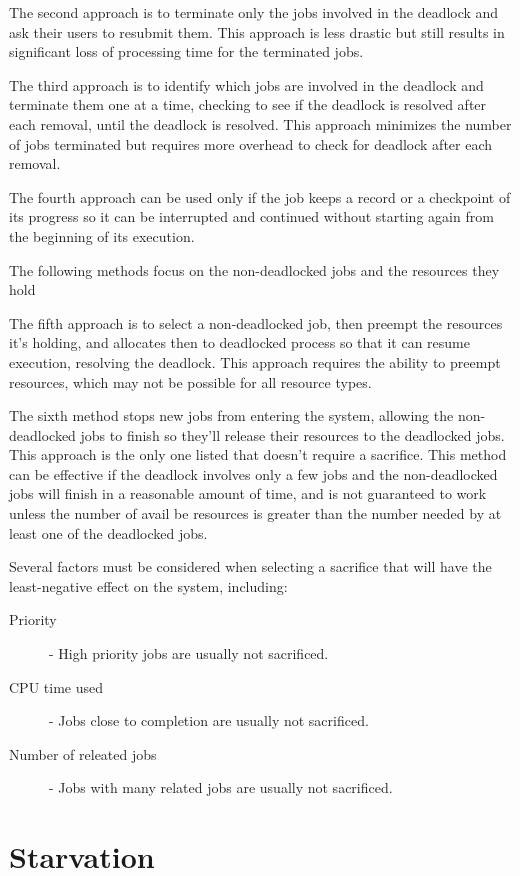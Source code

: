 \documentclass[12pt letter]{report}
\begin{document}
The second approach is to terminate only the jobs involved in the
deadlock and ask their users to resubmit them. This approach is less drastic but
still results in significant loss of processing time for the
terminated jobs.

The third approach is to identify which jobs are involved in the
deadlock and terminate them one at a time, checking to see if the
deadlock is resolved after each removal, until the deadlock is
resolved. This approach minimizes the number of jobs terminated but
requires more overhead to check for deadlock after each removal.

The fourth approach can be used only if the job keeps a record or a
checkpoint of its progress so it can be interrupted and continued
without starting again from the beginning of its execution.

The following methods focus on the non-deadlocked jobs and the
resources they hold

The fifth approach is to select a non-deadlocked job, then preempt
the resources it's holding, and allocates then to deadlocked process
so that it can resume execution, resolving the deadlock. This
approach requires the ability to preempt resources, which may not be
possible for all resource types.

The sixth method stops new jobs from entering the system, allowing
the non-deadlocked jobs to finish so they'll release their resources
to the deadlocked jobs. This approach is the only one listed that
doesn't require a sacrifice. This method can be effective if the
deadlock involves only a few jobs and the non-deadlocked jobs will
finish in a reasonable amount of time, and is not guaranteed to work
unless the number of avail be resources is greater than the number
needed by at least one of the deadlocked jobs.

Several factors must be considered when selecting a sacrifice that
will have the least-negative effect on the system, including:
\begin{description}
  \item[Priority]  - High priority jobs are usually not sacrificed.
  \item[CPU time used] - Jobs close to completion are usually not sacrificed.
  \item[Number of releated jobs] - Jobs with many related jobs are
    usually not sacrificed.
\end{description}

\section{Starvation}
\end{document}
